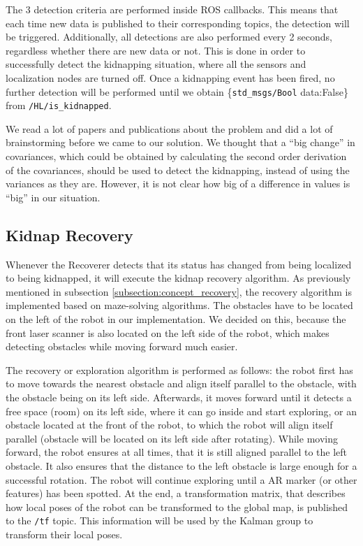 The 3 detection criteria are performed inside ROS callbacks. This means that each time new data is published to their corresponding topics, the detection will be triggered. Additionally, all detections are also performed every 2 seconds, regardless whether there are new data or not. This is done in order to successfully detect the kidnapping situation, where all the sensors and localization nodes are turned off. Once a kidnapping event has been fired, no further detection will be performed until we obtain \{\texttt{std\_msgs/Bool} data:False\} from \texttt{/HL/is\_kidnapped}.

We read a lot of papers and publications about the problem and did a lot of brainstorming before we came to our solution. We thought that a ``big change'' in covariances, which could be obtained by calculating the second order derivation of the covariances, should be used to detect the kidnapping, instead of using the variances as they are. However, it is not clear how big of a difference in values is ``big'' in our situation.

\subsection{Kidnap Recovery} \label{subsection:implementation_recovery}

Whenever the Recoverer detects that its status has changed from being localized to being kidnapped, it will execute the kidnap recovery algorithm. As previously mentioned in subsection \ref{subsection:concept_recovery}, the recovery algorithm is implemented based on maze-solving algorithms. The obstacles have to be located on the left of the robot in our implementation. We decided on this, because the front laser scanner is also located on the left side of the robot, which makes detecting obstacles while moving forward much easier.

The recovery or exploration algorithm is performed as follows: the robot first has to move towards the nearest obstacle and align itself parallel to the obstacle, with the obstacle being on its left side. Afterwards, it moves forward until it detects a free space (room) on its left side, where it can go inside and start exploring, or an obstacle located at the front of the robot, to which the robot will align itself parallel (obstacle will be located on its left side after rotating). While moving forward, the robot ensures at all times, that it is still aligned parallel to the left obstacle. It also ensures that the distance to the left obstacle is large enough for a successful rotation. The robot will continue exploring until a AR marker (or other features) has been spotted. At the end, a transformation matrix, that describes how local poses of the robot can be transformed to the global map, is published to the \texttt{/tf} topic. This information will be used by the Kalman group to transform their local poses.

